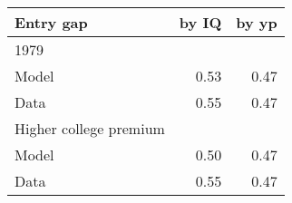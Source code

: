 \begin{tabular}{lrr}
\hline
Entry gap & by IQ  & by yp  \\ 
\hline
1979 &   &   \\ 
Model & 0.53  & 0.47  \\ 
Data & 0.55  & 0.47  \\ 
Higher college premium &   &   \\ 
Model & 0.50  & 0.47  \\ 
Data & 0.55  & 0.47  \\ 
\hline
\end{tabular}%
